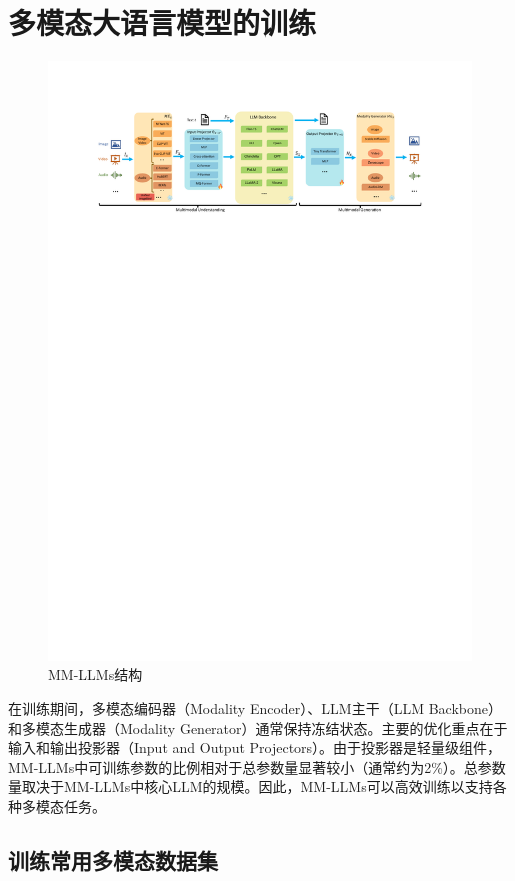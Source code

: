 \documentclass[12pt]{article}
\begin{document}
\section{多模态大语言模型的训练}

\begin{figure}[ht]
    \centering
    \includegraphics[width=1\textwidth, trim = 50 650 50 50]{MMLLM.pdf}
    \caption{MM-LLMs结构}
\end{figure}

在训练期间，多模态编码器（Modality Encoder）、LLM主干（LLM Backbone）和多模态生成器（Modality Generator）通常保持冻结状态。主要的优化重点在于输入和输出投影器（Input and Output Projectors）。由于投影器是轻量级组件，MM-LLMs中可训练参数的比例相对于总参数量显著较小（通常约为2\%）。总参数量取决于MM-LLMs中核心LLM的规模。因此，MM-LLMs可以高效训练以支持各种多模态任务。

\subsection{训练常用多模态数据集}
\end{document}
